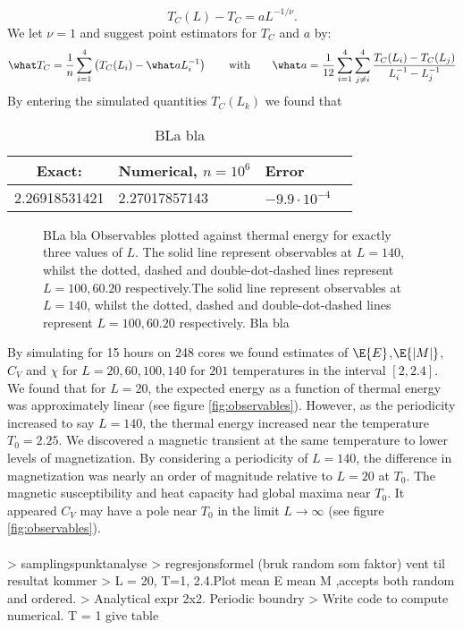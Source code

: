 \documentclass[11pt,english,a4paper]{article}
\begin{document}
\[
T_C(L) - T_C = aL^{-1/\nu}.
\]
We let $\nu = 1$ and suggest point estimators for $T_C$ and $a$ by:
\[
\what T _C = \frac{1}{n} \sum_{ i=1}^4 \left( T_C(L_i) - \what a L_i^{  -1} \right) \qquad \text{with} \qquad \what a = \frac{1}{12} \sum_{  i=1}^4 \sum_{j\neq i}^4 \frac{T_C(L_i) -T_C(L_j) }{L_i^{  -1} - L_j^{  -1} }
\]
By entering the simulated quantities $T_C(L_k)$ we found that 
\begin{table}[!h]
\center
\begin{tabular}{c l l l}
Exact:					& Numerical, $n = 10^6$& Error\\
\hline
2.26918531421 & 2.27017857143 & $-9.9 \cdot 10^{-4}$
\end{tabular}
\caption{BLa bla} \label{tab:phase transition}
\end{table}%

\begin{figure}
\center

\caption{BLa bla Observables plotted against thermal energy for exactly three values of $L$. The solid line represent observables at $L=140$, whilst the dotted, dashed and double-dot-dashed lines represent $L = 100,60.20$ respectively.The solid line represent observables at $L=140$, whilst the dotted, dashed and double-dot-dashed lines represent $L = 100,60.20$ respectively. Bla bla} \label{fig:signlerun}
\end{figure}%
By simulating for 15 hours on 248 cores we found estimates of $\E{E}$,$\E{|M|}$,$C_V$ and $\chi$ for $L=20,60,100,140$ for $201$ temperatures in the interval $[2,2.4]$. We found that for $L=20$, the expected energy as a function of thermal energy was approximately linear (see figure \ref{fig:observables}). However, as the periodicity increased to say $L=140$, the thermal energy increased near the temperature $T_0=2.25$. We discovered a magnetic transient at the same temperature to lower levels of magnetization. By considering a periodicity of $L=140$, the difference in magnetization was nearly an order of magnitude relative to $L=20$ at $T_0$. The magnetic susceptibility and heat capacity had global maxima near $T_0$. It appeared $C_V$ may have a pole near $T_0$ in the limit $L \to \infty$ (see figure \ref{fig:observables}).\\
\\


> samplingspunktanalyse
> regresjonsformel (bruk random som faktor) vent til resultat kommer
> L = 20, T=1, 2.4.Plot mean E mean M ,accepts both random and ordered.
> Analytical expr 2x2. Periodic boundry
> Write code to compute numerical. T = 1 give table
\end{document}
